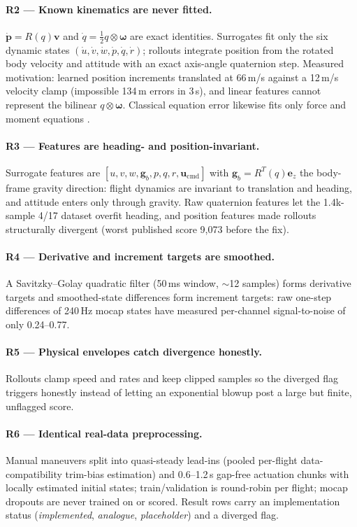 \documentclass[11pt]{article}
\begin{document}
\paragraph{R2 --- Known kinematics are never fitted.}
$\dot{\mathbf p}=R(q)\mathbf v$ and
$\dot q=\tfrac12 q\otimes\boldsymbol\omega$ are exact identities. Surrogates
fit only the six dynamic states $(\dot u,\dot v,\dot w,\dot p,\dot q,\dot
r)$; rollouts integrate position from the rotated body velocity and attitude
with an exact axis-angle quaternion step. Measured motivation: learned
position increments translated at 66\,m/s against a 12\,m/s velocity clamp
(impossible 134\,m errors in 3\,s), and linear features cannot represent the
bilinear $q\otimes\boldsymbol\omega$. Classical equation error likewise fits
only force and moment equations \cite{KleinMorelli2006}.

\paragraph{R3 --- Features are heading- and position-invariant.}
Surrogate features are $[u,v,w,\mathbf g_b,p,q,r,\mathbf u_{\mathrm{cmd}}]$
with $\mathbf g_b=R^{T}(q)\mathbf e_z$ the body-frame gravity direction:
flight dynamics are invariant to translation and heading, and attitude
enters only through gravity. Raw quaternion features let the 1.4k-sample
4/17 dataset overfit heading, and position features made rollouts
structurally divergent (worst published score 9{,}073 before the fix).

\paragraph{R4 --- Derivative and increment targets are smoothed.}
A Savitzky--Golay quadratic filter (50\,ms window, $\sim$12 samples) forms
derivative targets and smoothed-state differences form increment targets:
raw one-step differences of 240\,Hz mocap states have measured per-channel
signal-to-noise of only 0.24--0.77.

\paragraph{R5 --- Physical envelopes catch divergence honestly.}
Rollouts clamp speed and rates and keep clipped samples so the diverged
flag triggers honestly instead of letting an exponential blowup post a
large but finite, unflagged score.

\paragraph{R6 --- Identical real-data preprocessing.}
Manual maneuvers split into quasi-steady lead-ins (pooled per-flight
data-compatibility trim-bias estimation) and 0.6--1.2\,s gap-free actuation
chunks with locally estimated initial states; train/validation is
round-robin per flight; mocap dropouts are never trained on or scored.
Result rows carry an implementation status (\emph{implemented},
\emph{analogue}, \emph{placeholder}) and a diverged flag.
\end{document}
